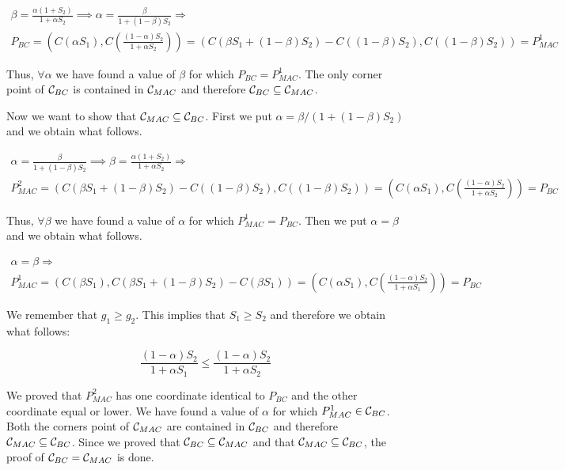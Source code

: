 \begin{gather*}
	\beta = \frac{\alpha(1+S_2)}{1+\alpha S_2} \implies  \alpha = \frac{\beta}{1+ (1-\beta) S_2} \Rightarrow \\
	P_{BC} = \left( C(\alpha S_1) , C \left( \frac{(1-\alpha)S_2}{1+\alpha S_2} \right) \right) = \left( C (\beta S_1 + (1-\beta)S_2) - C((1-\beta)S_2) , C \left( (1-\beta)S_2 \right) \right) = P_{MAC}^1
\end{gather*}

Thus, $\forall \alpha$ we have found a value of $\beta$ for which $P_{BC} = P_{MAC}^1$. The only corner point of $\mathcal{C}_{BC}$ is contained in $\mathcal{C}_{MAC}$ and therefore $\mathcal{C}_{BC} \subseteq \mathcal{C}_{MAC}$.

Now we want to show that $\mathcal{C}_{MAC} \subseteq \mathcal{C}_{BC}$. First we put $\alpha = \beta / (1+(1-\beta)S_2)$ and we obtain what follows.

\begin{gather*}
	\alpha = \frac{\beta}{1+ (1-\beta) S_2} \implies \beta = \frac{\alpha(1+S_2)}{1+\alpha S_2}  \Rightarrow \\
	P_{MAC}^2 = \left( C (\beta S_1 + (1-\beta)S_2) - C((1-\beta)S_2) , C \left( (1-\beta)S_2 \right) \right)
	= \left( C(\alpha S_1) , C \left( \frac{(1-\alpha)S_2}{1+\alpha S_2} \right) \right) = P_{BC}
\end{gather*}

Thus, $\forall \beta$ we have found a value of $\alpha$ for which $P_{MAC}^1 = P_{BC}$. Then we put $\alpha = \beta$ and we obtain what follows.

\begin{gather*}
	\alpha = \beta \Rightarrow \\
	P_{MAC}^1 = \left( C \left(\beta S_1 \right), C (\beta S_1 + (1-\beta)S_2) - C(\beta S_1) \right) =  \left( C \left(\alpha S_1 \right), C \left( \frac{(1-\alpha)S_2}{1 + \alpha S_1}\right) \right) = P_{BC}
\end{gather*}

We remember that $g_1 \geq g_2$. This implies that $S_1 \geq S_2$ and therefore we obtain what follows:

\begin{equation*}
	\frac{(1-\alpha)S_2}{1 + \alpha S_1} \leq \frac{(1-\alpha)S_2}{1 + \alpha S_2}
\end{equation*}

We proved that $P_{MAC}^2$ has one coordinate identical to $P_{BC}$ and the other coordinate equal or lower. We have found a value of $\alpha$ for which $P_{MAC}^1 \in \mathcal{C}_{BC}$. Both the corners point of $\mathcal{C}_{MAC}$ are contained in $\mathcal{C}_{BC}$ and therefore $\mathcal{C}_{MAC} \subseteq \mathcal{C}_{BC}$. Since we proved that $\mathcal{C}_{BC} \subseteq \mathcal{C}_{MAC}$ and that $\mathcal{C}_{MAC} \subseteq \mathcal{C}_{BC}$, the proof of $\mathcal{C}_{BC}=\mathcal{C}_{MAC}$ is done.

